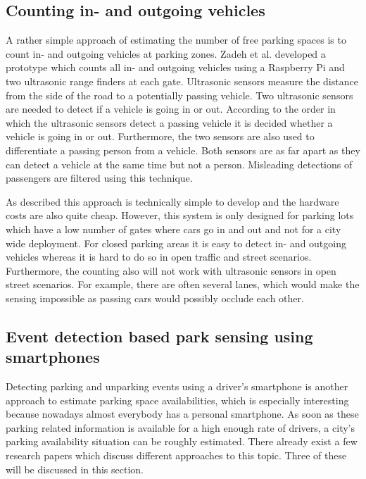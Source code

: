 \subsection{Counting in- and outgoing vehicles}
\label{sec:counting_in_out_park_sensing}

A rather simple approach of estimating the number of free parking spaces is to count in- and outgoing vehicles at parking zones. Zadeh et al. \cite{smarturbanparkingdetection} developed a prototype which counts all in- and outgoing vehicles using a Raspberry Pi and two ultrasonic range finders at each gate. Ultrasonic sensors measure the distance from the side of the road to a potentially passing vehicle. Two ultrasonic sensors are needed to detect if a vehicle is going in or out. According to the order in which the ultrasonic sensors detect a passing vehicle it is decided whether a vehicle is going in or out. Furthermore, the two sensors are also used to differentiate a passing person from a vehicle. Both sensors are as far apart as they can detect a vehicle at the same time but not a person. Misleading detections of passengers are filtered using this technique.

As described this approach is technically simple to develop and the hardware costs are also quite cheap. However, this system is only designed for parking lots which have a low number of gates where cars go in and out and not for a city wide deployment. For closed parking areas it is easy to detect in- and outgoing vehicles whereas it is hard to do so in open traffic and street scenarios. Furthermore, the counting also will not work with ultrasonic sensors in open street scenarios. For example, there are often several lanes, which would make the sensing impossible as passing cars would possibly occlude each other.






\subsection{Event detection based park sensing using smartphones}
\label{sec:event_detection_park_sensing}

Detecting parking and unparking events using a driver's smartphone is another approach to estimate parking space availabilities, which is especially interesting because nowadays almost everybody has a personal smartphone. As soon as these parking related information is available for a high enough rate of drivers, a city's parking availability situation can be roughly estimated. There already exist a few research papers which discuss different approaches to this topic. Three of these will be discussed in this section.

